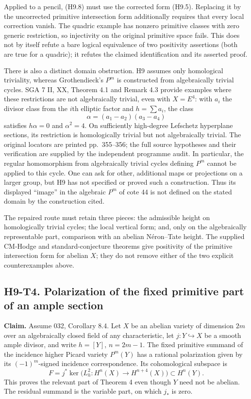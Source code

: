 \documentclass[11pt,a4paper]{article}
\begin{document}
Applied to a pencil, (H9.8) must use the corrected form (H9.5). Replacing
it by the uncorrected primitive intersection form additionally requires
that every local correction vanish. The quadric example has nonzero
primitive classes with zero generic restriction, so injectivity on the
original primitive space fails. This does not by itself refute a bare
logical equivalence of two positivity assertions (both are true for a
quadric); it refutes the claimed identification and its asserted proof.

There is also a distinct domain obstruction. H9 assumes only homological
triviality, whereas Grothendieck's $P^m$ is constructed from algebraically
trivial cycles. SGA 7 II, XX, Theorem 4.1 and Remark 4.3 provide examples
where these restrictions are not algebraically trivial, even with
$X=E^4$: with $a_i$ the divisor class from the $i$th elliptic factor and
$h=\sum a_i$, the class
\[
 \alpha=(a_1-a_2)(a_3-a_4)
\]
satisfies $h\alpha=0$ and $\alpha^2=4$. On sufficiently high-degree
Lefschetz hyperplane sections, its restriction is homologically trivial
but not algebraically trivial. The original locators are printed
pp.~355--356; the full source hypotheses and their verification are
supplied by the independent programme audit. In particular, the regular
homomorphism from algebraically trivial cycles defining $P^m$ cannot be
applied to this cycle. One can ask for other, additional maps or
projections on a larger group, but H9 has not specified or proved such a
construction. Thus its displayed ``image'' in the algebraic $P^m$ of
cote 44 is not defined on the stated domain by the construction cited.

The repaired route must retain three pieces: the admissible height on
homologically trivial cycles; the local vertical form; and, only on the
algebraically representable part, comparison with an abelian
N\'eron--Tate height. The supplied CM-Hodge and standard-conjecture theorems
give positivity of the primitive intersection form for abelian $X$; they
do not remove either of the two explicit counterexamples above.

\subsection*{H9-T4. Polarization of the fixed primitive part of an ample section}

\textbf{Claim.} Assume 032, Corollary 8.4. Let $X$ be an abelian variety
of dimension $2m$ over an algebraically closed field of any characteristic,
let $j:Y\hookrightarrow X$ be a smooth ample divisor, and write
$h=[Y]$, $n=2m-1$. The fixed primitive summand of the incidence higher
Picard variety $P^m(Y)$ has a rational polarization given by its
$(-1)^m$-signed incidence correspondence. Its cohomological subspace is
\[
 F=j^*\ker\bigl(L_h^2:H^{n}(X)\longrightarrow H^{n+4}(X)\bigr)
       \subset H^n(Y).
\]
This proves the relevant part of Theorem 4 even though $Y$ need not be
abelian. The residual summand is the variable part, on which $j_*$ is zero.
\end{document}
